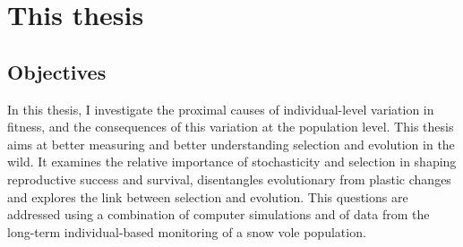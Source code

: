 \section{This thesis}
\subsection{Objectives}
In this thesis, I investigate the proximal causes of individual-level variation in fitness, and the consequences of this variation at the population level. This thesis aims at better measuring and better understanding selection and evolution in the wild. It examines the relative importance of stochasticity and selection in shaping reproductive success and survival, disentangles evolutionary from plastic changes and explores the link between selection and evolution. This questions are addressed using a combination of computer simulations and of data from the long-term individual-based monitoring of a snow vole population.

